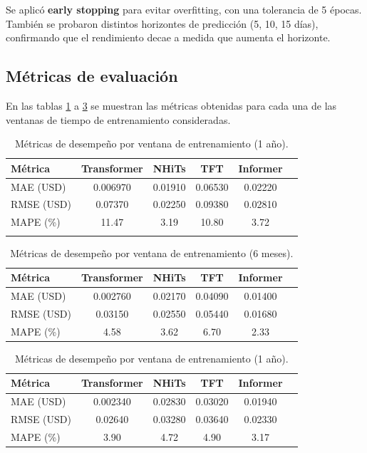 \documentclass[12pt]{article}
\begin{document}
Se aplicó \textbf{early stopping} para evitar overfitting, con una tolerancia de 5 épocas. También se probaron distintos horizontes de predicción (5, 10, 15 días), confirmando que el rendimiento decae a medida que aumenta el horizonte.

\bigskip
\subsection{Métricas de evaluación}

En las tablas \ref{metricas_3_meses} a  \ref{metricas_1_anio} se muestran las métricas obtenidas para cada una de las ventanas de tiempo de entrenamiento consideradas.

\begin{table}[H]
\centering
\caption{Métricas de desempeño por ventana de entrenamiento (1 año).}
\begin{tabular}{lccccc}
\toprule
\textbf{Métrica} & \textbf{Transformer} & \textbf{NHiTs} & \textbf{TFT} & \textbf{Informer} \\ 
\midrule
MAE (USD)  & 0.006970 & 0.01910 & 0.06530 & 0.02220 \\
RMSE (USD) & 0.07370 & 0.02250 & 0.09380 & 0.02810 \\
MAPE (\%)  & 11.47 & 3.19 & 10.80 & 3.72 \\
\bottomrule
\label{metricas_3_meses}
\end{tabular}
\end{table}

\begin{table}[H]
\centering
\caption{Métricas de desempeño por ventana de entrenamiento (6 meses).}
\begin{tabular}{lccccc}
\toprule
\textbf{Métrica} & \textbf{Transformer} & \textbf{NHiTs} & \textbf{TFT} & \textbf{Informer} \\ 
\midrule
MAE (USD)  & 0.002760 & 0.02170 & 0.04090 & 0.01400 \\
RMSE (USD) & 0.03150 & 0.02550 & 0.05440 & 0.01680 \\
MAPE (\%)  & 4.58 & 3.62 & 6.70 & 2.33 \\
\bottomrule
\end{tabular}
\label{metricas_6_meses}
\end{table}


\begin{table}[H]
\centering
\caption{Métricas de desempeño por ventana de entrenamiento (1 año).}
\begin{tabular}{lccccc}
\toprule
\textbf{Métrica} & \textbf{Transformer} & \textbf{NHiTs} & \textbf{TFT} & \textbf{Informer} \\ 
\midrule
MAE (USD)  & 0.002340 & 0.02830 & 0.03020 & 0.01940 \\
RMSE (USD) & 0.02640 & 0.03280 & 0.03640 & 0.02330 \\
MAPE (\%)  & 3.90 & 4.72 & 4.90 & 3.17 \\
\bottomrule
\end{tabular}
\label{metricas_1_anio}
\end{table}
\end{document}
